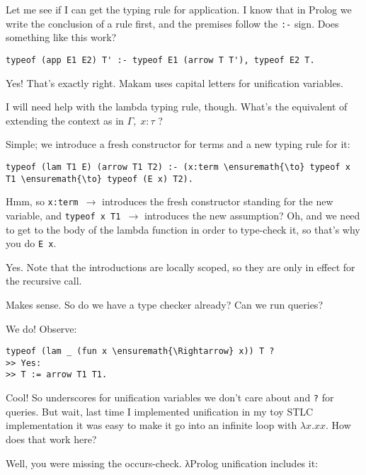 \heroSTUDENT{} Let me see if I can get the typing rule for application. I know
that in Prolog we write the conclusion of a rule first, and the premises
follow the \texttt{:-} sign. Does something like this work?

\begin{verbatim}
typeof (app E1 E2) T' :- typeof E1 (arrow T T'), typeof E2 T.
\end{verbatim}

\heroADVISOR{} Yes! That's exactly right. Makam uses capital letters for
unification variables.

\heroSTUDENT{} I will need help with the lambda typing rule, though. What's
the equivalent of extending the context as in \(\Gamma, \; x : \tau\) ?

\heroADVISOR{} Simple; we introduce a fresh constructor for terms and a new
typing rule for it:

\begin{verbatim}
typeof (lam T1 E) (arrow T1 T2) :- (x:term \ensuremath{\to} typeof x T1 \ensuremath{\to} typeof (E x) T2).
\end{verbatim}

\heroSTUDENT{} Hmm, so \texttt{x:term\ \ensuremath{\to}} introduces the fresh
constructor standing for the new variable, and
\texttt{typeof\ x\ T1\ \ensuremath{\to}} introduces the new assumption?
Oh, and we need to get to the body of the lambda function in order to
type-check it, so that's why you do \texttt{E\ x}.

\heroADVISOR{} Yes. Note that the introductions are locally scoped, so they
are only in effect for the recursive call.

\heroSTUDENT{} Makes sense. So do we have a type checker already? Can we run
queries?

\heroADVISOR{} We do! Observe:

\begin{verbatim}
typeof (lam _ (fun x \ensuremath{\Rightarrow} x)) T ?
>> Yes:
>> T := arrow T1 T1.
\end{verbatim}

\heroSTUDENT{} Cool! So underscores for unification variables we don't care
about and \texttt{?} for queries. But wait, last time I implemented
unification in my toy STLC implementation it was easy to make it go into
an infinite loop with \(\lambda x. x x\). How does that work here?

\heroADVISOR{} Well, you were missing the occurs-check. \foreignlanguage{greek}{λ}Prolog unification
includes it:

